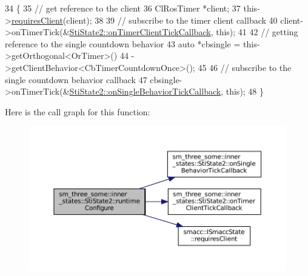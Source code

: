 \begin{DoxyCode}
34   \{
35     \textcolor{comment}{// get reference to the client}
36     ClRosTimer *client;
37     this->\hyperlink{classsmacc_1_1ISmaccState_a7f95c9f0a6ea2d6f18d1aec0519de4ac}{requiresClient}(client);
38 
39     \textcolor{comment}{// subscribe to the timer client callback}
40     client->onTimerTick(&\hyperlink{structsm__three__some_1_1inner__states_1_1StiState2_a59008027e276123e39a8908116ea8ab9}{StiState2::onTimerClientTickCallback}, \textcolor{keyword}{this});
41 
42     \textcolor{comment}{// getting reference to the single countdown behavior}
43     \textcolor{keyword}{auto} *cbsingle = this->getOrthogonal<OrTimer>()
44                          ->getClientBehavior<CbTimerCountdownOnce>();
45 
46     \textcolor{comment}{// subscribe to the single countdown behavior callback}
47     cbsingle->onTimerTick(&\hyperlink{structsm__three__some_1_1inner__states_1_1StiState2_ad29b2ce248085bc08950b43726a84d18}{StiState2::onSingleBehaviorTickCallback}, \textcolor{keyword}{
      this});
48   \}
\end{DoxyCode}
Here is the call graph for this function\+:
\nopagebreak
\begin{figure}[H]
\begin{center}
\leavevmode
\includegraphics[width=350pt]{structsm__three__some_1_1inner__states_1_1StiState2_a46bf7c838fb2cbf92e5b17b17165af41_cgraph}
\end{center}
\end{figure}
\mbox{\label{structsm__three__some_1_1inner__states_1_1StiState2_a52ec97e0ac51c91508349adf358045ea}} 
